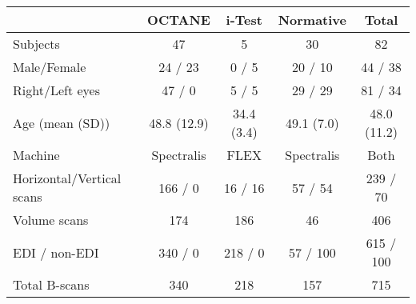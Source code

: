 \begin{tabular}{@{}lccc|c@{}}
\toprule
\hspace{3em}                    & \hspace{1em}OCTANE\hspace{1.3em}       & \hspace{1em}i-Test\hspace{1.3em}     &\hspace{1em}Normative\hspace{1.3em}  & Total        \\ \midrule
Subjects            & 47           & 5          & 30         & 82           \\
Male/Female         & 24 / 23     & 0 / 5      & 20 / 10    & 44 / 38     \\
Right/Left eyes     & 47 / 0       & 5 / 5      & 29 / 29    & 81 / 34      \\
Age (mean (SD))     & 48.8 (12.9) & 34.4 (3.4) & 49.1 (7.0) & 48.0 (11.2) \\
Machine             & Spectralis            & FLEX          & Spectralis          &    Both          \\
Horizontal/Vertical scans & 166 / 0      & 16 / 16    & 57 / 54    & 239 / 70     \\
Volume scans           & 174          & 186        & 46         & 406          \\
EDI / non-EDI         & 340 / 0          & 218 / 0        & 57 / 100  & 615 / 100         \\
Total B-scans         & 340          & 218        & 157    & 715          \\ \bottomrule
\end{tabular}%
